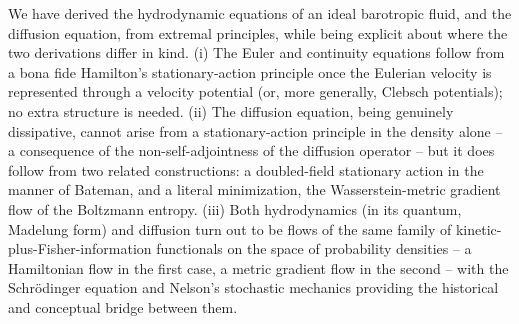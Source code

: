 \documentclass[11pt]{article}
\begin{document}
We have derived the hydrodynamic equations of an ideal barotropic fluid, and the diffusion equation, from extremal principles, while being explicit about where the two derivations differ in kind. (i) The Euler and continuity equations follow from a bona fide Hamilton's stationary-action principle once the Eulerian velocity is represented through a velocity potential (or, more generally, Clebsch potentials); no extra structure is needed. (ii) The diffusion equation, being genuinely dissipative, cannot arise from a stationary-action principle in the density alone -- a consequence of the non-self-adjointness of the diffusion operator -- but it does follow from two related constructions: a doubled-field stationary action in the manner of Bateman, and a literal minimization, the Wasserstein-metric gradient flow of the Boltzmann entropy. (iii) Both hydrodynamics (in its quantum, Madelung form) and diffusion turn out to be flows of the same family of kinetic-plus-Fisher-information functionals on the space of probability densities -- a Hamiltonian flow in the first case, a metric gradient flow in the second -- with the Schr\"odinger equation and Nelson's stochastic mechanics providing the historical and conceptual bridge between them.
\end{document}
